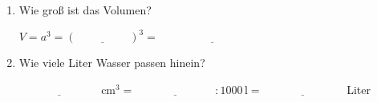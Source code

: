 \begin{enumerate}[label=\arabic*.]
    \begin{enumerate}[label=\alph*)]
        \item Wie groß ist das Volumen?

        $V = a^3 = (\underline{\hspace{2cm}})^3 = \underline{\hspace{4cm}}$

        \vspace{0.5cm}

        \item Wie viele Liter Wasser passen hinein?

        $\underline{\hspace{3cm}}\,\text{cm}^3 = \underline{\hspace{3cm}} : 1000\,\text{l} = \underline{\hspace{3cm}}$ Liter
    \end{enumerate}
\end{enumerate}
